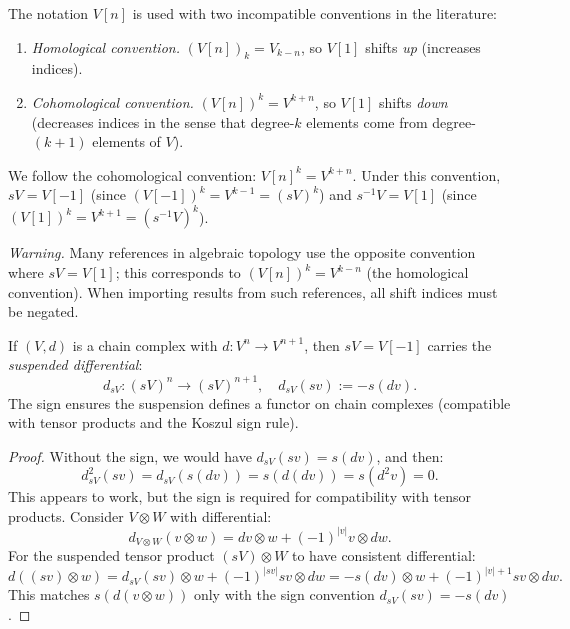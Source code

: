 \begin{remark}
\label{rem:shift-notation}
The notation $V[n]$ is used with two incompatible conventions in the literature:
\begin{enumerate}[label=(\roman*)]
\item \emph{Homological convention.} $(V[n])_k = V_{k-n}$, so $V[1]$ shifts
\emph{up} (increases indices).
\item \emph{Cohomological convention.} $(V[n])^k = V^{k+n}$, so $V[1]$ shifts 
\emph{down} (decreases indices in the sense that degree-$k$ elements come from 
degree-$(k+1)$ elements of $V$).
\end{enumerate}
We follow the cohomological convention: $V[n]^k = V^{k+n}$. Under this convention,
$sV = V[-1]$ (since $(V[-1])^k = V^{k-1} = (sV)^k$) and
$s^{-1}V = V[1]$ (since $(V[1])^k = V^{k+1} = (s^{-1}V)^k$).

\emph{Warning.} Many references in algebraic topology use the opposite convention where $sV = V[1]$; this corresponds to $(V[n])^k = V^{k-n}$ (the homological convention). When importing results from such references, all shift indices must be negated.
\end{remark}

\begin{proposition}
\label{prop:susp-diff}
If $(V, d)$ is a chain complex with $d: V^n \to V^{n+1}$, then $sV = V[-1]$
carries the \emph{suspended differential}:
\[
d_{sV}: (sV)^n \to (sV)^{n+1}, \quad d_{sV}(sv) := -s(dv).
\]
The sign ensures the suspension defines a functor on chain complexes (compatible with tensor products and the Koszul sign rule).
\end{proposition}

\begin{proof}
Without the sign, we would have $d_{sV}(sv) = s(dv)$, and then:
\[
d_{sV}^2(sv) = d_{sV}(s(dv)) = s(d(dv)) = s(d^2 v) = 0.
\]
This appears to work, but the sign is required for compatibility with tensor 
products. Consider $V \otimes W$ with differential:
\[
d_{V \otimes W}(v \otimes w) = dv \otimes w + (-1)^{|v|} v \otimes dw.
\]
For the suspended tensor product $(sV) \otimes W$ to have consistent differential:
\[
d((sv) \otimes w) = d_{sV}(sv) \otimes w + (-1)^{|sv|} sv \otimes dw 
= -s(dv) \otimes w + (-1)^{|v|+1} sv \otimes dw.
\]
This matches $s(d(v \otimes w))$ only with the sign convention $d_{sV}(sv) = -s(dv)$.
\end{proof}

